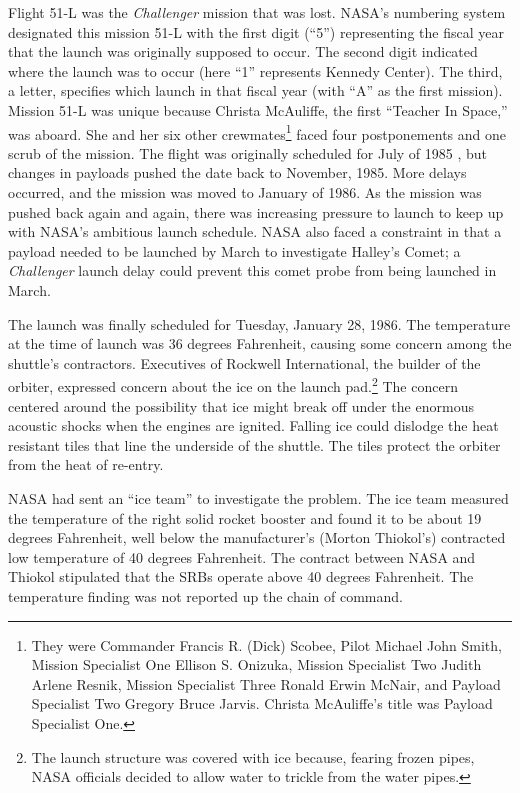 Flight 51-L was the {\em Challenger} mission that was lost. 
NASA's numbering system designated this mission 51-L with the
first digit (``5'') representing the fiscal year that the
launch was originally supposed to occur.  The second digit
indicated where the launch was to occur (here ``1''
represents Kennedy Center).  The third, a letter, specifies
which launch in that fiscal year (with ``A'' as the first
mission).  Mission 51-L was unique
because Christa McAuliffe, the first ``Teacher In
Space,'' was aboard.  She and her six other
crewmates\footnote{They were Commander Francis R. (Dick) Scobee,
Pilot
Michael John Smith, Mission Specialist One Ellison S.
Onizuka, Mission Specialist Two Judith Arlene Resnik,
Mission Specialist Three Ronald Erwin McNair, and Payload
Specialist Two Gregory Bruce Jarvis.  Christa McAuliffe's
title was Payload Specialist One.} faced four postponements
and one scrub of the mission.  The flight was originally
scheduled for July of 1985 \cite[vol. 1, p. 10]{rogers}, but
changes in payloads pushed the date back to November, 1985. 
More delays occurred, and the mission was moved to January of
1986.  As the mission was pushed back again and again, there
was increasing pressure to launch to keep up with NASA's
ambitious launch schedule.  NASA also faced a constraint in
that a payload needed to be launched by March to investigate
Halley's Comet; a {\em Challenger} launch delay could
prevent this comet probe from being launched in March.

The launch was finally scheduled for Tuesday, January 28,
1986.  The temperature at the time of launch was 36 degrees
Fahrenheit, causing some concern among the shuttle's
contractors.  Executives of Rockwell International, the builder of
the
orbiter, expressed concern about the ice on the
launch pad.\footnote{The launch structure was covered with
ice because, fearing frozen pipes, NASA officials decided to
allow water to trickle from the water pipes.}  The concern
centered around the possibility that ice might break off
under the enormous acoustic shocks when the engines are
ignited.  Falling ice could dislodge the heat
resistant tiles that line the underside of the shuttle.
The tiles protect the orbiter from the heat of re-entry.

NASA had sent an ``ice team'' to investigate the problem. 
The ice team measured the temperature of the right solid
rocket booster and found it to be about 19 degrees
Fahrenheit, well below the manufacturer's (Morton Thiokol's)
contracted low temperature of 40 degrees Fahrenheit.  
The contract between NASA and Thiokol stipulated that the
SRBs operate above 40 degrees Fahrenheit.  The temperature
finding was not reported up the chain of command.

